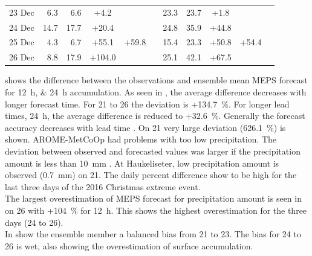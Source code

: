 \begin{table}[t]
\begin{center}
\begin{tabular}{c||r|r|c|c|c||r|r|c|c|c}
			\num{23} Dec & \num{6.3} & \num{6.6} & +\num{4.2} & & & \num{23.3} & \num{23.7} & +\num{1.8} &  &  \\\cline{1-5}\cline{7-10}
			\num{24} Dec & \num{14.7} & \num{17.7} & +\num{20.4} & \multirow{3}{*}{+\num{59.8}} & & \num{24.8} & \num{35.9} & +\num{44.8} & \multirow{3}{*}{+\num{54.4}}  &  \\\cline{1-4}\cline{7-9}
			\num{25} Dec & \num{4.3} & \num{6.7} & +\num{55.1} & & & \num{15.4} & \num{23.3} & +\num{50.8} & &   \\\cline{1-4}\cline{7-9}
			\num{26} Dec & \num{8.8} & \num{17.9} & +\num{104.0} & & & \num{25.1} & \num{42.1} & +\num{67.5} &  &  \\\hline\hline
		\end{tabular}
	\end{center}
\end{table}
\noindent
{} shows the difference between the observations and ensemble mean MEPS forecast for \SIlist{12;24}{\hour} accumulation. As seen in , the average difference decreases with longer forecast time. For \num{21} to \SI{26}{\dec} the deviation is +\SI{134.7}{\percent}. For longer lead times, \SI{24}{\hour}, the average difference is reduced to +\SI{32.6}{\percent}. Generally the forecast accuracy decreases with lead time \citep{kalnay_atmospheric_2003}.
On \SI{21}{\dec} very large deviation (\SI{626.1}{\percent}) is shown. 
AROME-MetCoOp had problems with too low precipitation. The deviation between observed and forecasted values was larger if the precipitation amount is less than \SI{10}{\mm} \citep{muller_arome-metcoop:_2017}. At Haukeliseter, low precipitation amount is observed (\SI{0.7}{\mm}) on \SI{21}{\dec}.
The daily percent difference show to be high for the last three days of the 2016 Christmas extreme event.  
\\
The largest overestimation of MEPS forecast for precipitation amount is seen in  on \SI{26}{\dec} with +\SI{104}{\percent} for \SI{12}{\hour}. This shows the highest overestimation for the three days (\num{24} to \SI{26}{\dec}).
\\
In  show the ensemble member a balanced bias from \num{21} to \SI{23}{\dec}. The bias for \num{24} to \SI{26}{\dec} is wet, also showing the overestimation of surface accumulation.
